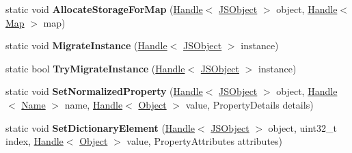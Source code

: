 \begin{DoxyCompactItemize}
\item 
static void {\bfseries Allocate\+Storage\+For\+Map} (\hyperlink{classv8_1_1internal_1_1_handle}{Handle}$<$ \hyperlink{classv8_1_1internal_1_1_j_s_object}{J\+S\+Object} $>$ object, \hyperlink{classv8_1_1internal_1_1_handle}{Handle}$<$ \hyperlink{classv8_1_1internal_1_1_map}{Map} $>$ map)\hypertarget{classv8_1_1internal_1_1_j_s_object_a03637647218c927f73ff61a2a94318ba}{}\label{classv8_1_1internal_1_1_j_s_object_a03637647218c927f73ff61a2a94318ba}

\item 
static void {\bfseries Migrate\+Instance} (\hyperlink{classv8_1_1internal_1_1_handle}{Handle}$<$ \hyperlink{classv8_1_1internal_1_1_j_s_object}{J\+S\+Object} $>$ instance)\hypertarget{classv8_1_1internal_1_1_j_s_object_aecc850e35fb6912ed2d5b786abad1f64}{}\label{classv8_1_1internal_1_1_j_s_object_aecc850e35fb6912ed2d5b786abad1f64}

\item 
static bool {\bfseries Try\+Migrate\+Instance} (\hyperlink{classv8_1_1internal_1_1_handle}{Handle}$<$ \hyperlink{classv8_1_1internal_1_1_j_s_object}{J\+S\+Object} $>$ instance)\hypertarget{classv8_1_1internal_1_1_j_s_object_a95233ff548a330733c02362f81275abb}{}\label{classv8_1_1internal_1_1_j_s_object_a95233ff548a330733c02362f81275abb}

\item 
static void {\bfseries Set\+Normalized\+Property} (\hyperlink{classv8_1_1internal_1_1_handle}{Handle}$<$ \hyperlink{classv8_1_1internal_1_1_j_s_object}{J\+S\+Object} $>$ object, \hyperlink{classv8_1_1internal_1_1_handle}{Handle}$<$ \hyperlink{classv8_1_1internal_1_1_name}{Name} $>$ name, \hyperlink{classv8_1_1internal_1_1_handle}{Handle}$<$ \hyperlink{classv8_1_1internal_1_1_object}{Object} $>$ value, Property\+Details details)\hypertarget{classv8_1_1internal_1_1_j_s_object_ad6feff8781a3b737d1060771d67fba3d}{}\label{classv8_1_1internal_1_1_j_s_object_ad6feff8781a3b737d1060771d67fba3d}

\item 
static void {\bfseries Set\+Dictionary\+Element} (\hyperlink{classv8_1_1internal_1_1_handle}{Handle}$<$ \hyperlink{classv8_1_1internal_1_1_j_s_object}{J\+S\+Object} $>$ object, uint32\+\_\+t index, \hyperlink{classv8_1_1internal_1_1_handle}{Handle}$<$ \hyperlink{classv8_1_1internal_1_1_object}{Object} $>$ value, Property\+Attributes attributes)\hypertarget{classv8_1_1internal_1_1_j_s_object_a6f8e02804d4b7f39678dc5dd35432bd3}{}\label{classv8_1_1internal_1_1_j_s_object_a6f8e02804d4b7f39678dc5dd35432bd3}


\end{DoxyCompactItemize}
